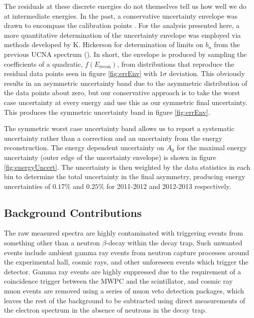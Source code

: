 The residuals at these discrete energies do not
themselves tell us how well we do at intermediate energies. In the past, a conservative
uncertainty envelope was drawn to encompass the calibration points
\cite{mendenhall2013,mpmThesis}. For the analysis
presented here, a more quantitative determination of the uncertainty envelope was employed
via methods developed by K. Hickerson for determination of limits on $b_n$ from the previous
UCNA spectrum (\cite{hickerson2017}). In short, the envelope is produced by sampling
the coefficients of a quadratic, $f(E_{\mathrm{recon}})$, from distributions that reproduce
the residual data points seen in figure \ref{fig:errEnv} with $1\sigma$ deviation.
This
obviously results in an asymmetric uncertainty band due to the asymmetric distribution
of the data points about zero, but our conservative approach is
to take the worst case uncertainty at every energy and use this as our
symmetric final uncertainty.
This produces the symmetric uncertainty band in figure \ref{fig:errEnv}.

The symmetric worst case uncertainty band allows us to report a systematic uncertainty
rather than a correction and an uncertainty from the energy reconstruction. The energy
dependent uncertainty on $A_0$ for the maximal energy uncertainty (outer edge of the
uncertainty envelope) is shown in figure \ref{fig:energyUncert}.
The uncertainty is then weighted by the data statistics in each bin to determine the
total uncertainty in the final asymmetry, producing energy uncertainties of $0.17\%$ and
$0.25\%$ for 2011-2012 and 2012-2013 respectively.

\subsection{Background Contributions}

The raw measured spectra are highly contaminated with triggering events from something other
than a neutron $\beta$-decay within the decay trap. Such unwanted events include ambient
gamma ray events from neutron capture processes around the experimental hall, cosmic rays,
and other unforeseen events which trigger the detector.
Gamma ray events are highly suppressed due to the
requirement of a coincidence trigger between the MWPC and the scintillator,
and cosmic ray muon events are removed using a series of muon veto
detection packages, which leaves the rest of the background to be subtracted using direct
measurements of the electron spectrum in the absence of neutrons in the decay trap.

